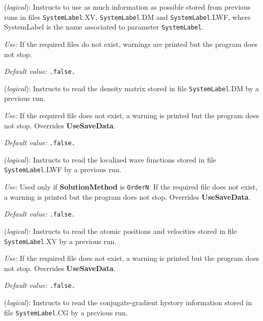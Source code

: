 \documentclass[11pt]{article}
\begin{document}
\begin{description}
\itemsep 10pt
\parsep 0pt


\item[{\bf UseSaveData}] ({\it logical}): 
Instructs to use as much information as possible stored from
previous runs in files {\tt SystemLabel}.XV, {\tt SystemLabel}.DM and
{\tt SystemLabel}.LWF, where SystemLabel is the name associated
to parameter {\tt SystemLabel}.

{\it Use:} If the required files do not exist, warnings are
printed but the program does not stop.

{\it Default value:} {\tt .false.}
        

\item[{\bf DM.UseSaveDM}] ({\it logical}): 
Instructs to read the density matrix stored in file
{\tt SystemLabel}.DM by a previous run.

{\it Use:} If the required file does not exist, a warning is
printed but the program does not stop. Overrides {\bf UseSaveData}.

{\it Default value:} {\tt .false.}


\item[{\bf ON.UseSaveLWF}] ({\it logical}): 
Instructs to read the localized wave functions stored in file
{\tt SystemLabel}.LWF by a previous run.

{\it Use:} Used only if {\bf SolutionMethod} is {\tt OrderN}.
If the required file does not exist, a warning is
printed but the program does not stop. Overrides {\bf UseSaveData}.

{\it Default value:} {\tt .false.}

 
\item[{\bf MD.UseSaveXV}] ({\it logical}):
Instructs to read the atomic positions and velocities stored
in file {\tt SystemLabel}.XV by a previous run.
 
{\it Use:} If the required file does not exist, a warning is
printed but the program does not stop. Overrides {\bf UseSaveData}.
 
{\it Default value:} {\tt .false.}


\item[{\bf MD.UseSaveCG}] ({\it logical}): 
Instructs to read the conjugate-gradient hystory information stored
in file {\tt SystemLabel}.CG by a previous run.


\end{description}
\end{document}
